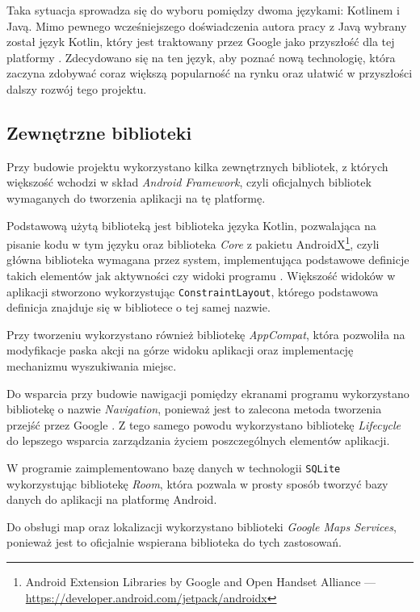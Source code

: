 \documentclass[polish,polish,a4paper,12pt]{article}
\begin{document}
	Taka sytuacja sprowadza się do wyboru pomiędzy dwoma językami: Kotlinem i Javą. Mimo pewnego wcześniejszego doświadczenia autora pracy z Javą wybrany został język Kotlin, który jest traktowany przez Google jako przyszłość dla tej platformy \cite{kotlinfirst}. Zdecydowano się na ten język, aby poznać nową technologię, która zaczyna zdobywać coraz większą popularność na rynku oraz ułatwić w przyszłości dalszy rozwój tego projektu.

	\subsection{Zewnętrzne biblioteki}

	Przy budowie projektu wykorzystano kilka zewnętrznych bibliotek, z których większość wchodzi w skład \textit{Android Framework}, czyli oficjalnych bibliotek wymaganych do tworzenia aplikacji na tę platformę.

	Podstawową użytą biblioteką jest biblioteka języka Kotlin, pozwalająca na pisanie kodu w tym języku oraz biblioteka \textit{Core} z pakietu AndroidX\footnote{Android Extension Libraries by Google and Open Handset Alliance — \url{https://developer.android.com/jetpack/androidx}}, czyli główna biblioteka wymagana przez system, implementująca podstawowe definicje takich elementów jak aktywności czy widoki programu \cite{androidapi}. Większość widoków w aplikacji stworzono wykorzystując \texttt{ConstraintLayout}, którego podstawowa definicja znajduje się w bibliotece o tej samej nazwie.

	Przy tworzeniu wykorzystano również bibliotekę \textit{AppCompat}, która pozwoliła na modyfikacje paska akcji na górze widoku aplikacji oraz implementację mechanizmu wyszukiwania miejsc.

	Do wsparcia przy budowie nawigacji pomiędzy ekranami programu wykorzystano bibliotekę o nazwie \textit{Navigation}, ponieważ jest to zalecona metoda tworzenia przejść przez Google \cite{androiddevelopment}. Z tego samego powodu wykorzystano bibliotekę \textit{Lifecycle} do lepszego wsparcia zarządzania życiem poszczególnych elementów aplikacji.

	W programie zaimplementowano bazę danych w technologii \texttt{SQLite} wykorzystując bibliotekę \textit{Room}, która pozwala w prosty sposób tworzyć bazy danych do aplikacji na platformę Android.

	Do obsługi map oraz lokalizacji wykorzystano biblioteki \textit{Google Maps Services}, ponieważ jest to oficjalnie wspierana biblioteka do tych zastosowań.
\end{document}
